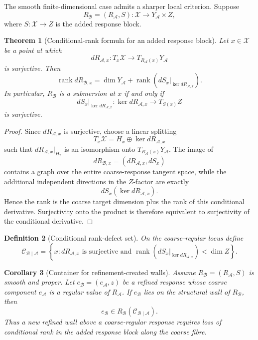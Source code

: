 \documentclass[11pt]{article}
\newtheorem{definition}{Definition}[section]
\newtheorem{theorem}[definition]{Theorem}
\newtheorem{corollary}[definition]{Corollary}
\newcommand{\X}{\mathcal X}
\newcommand{\Acal}{\mathcal A}
\newcommand{\Bcal}{\mathcal B}
\begin{document}
The smooth finite-dimensional case admits a sharper local criterion. Suppose
\[
R_{\Bcal}=(R_{\Acal},S):\X\to Y_{\Acal}\times Z,
\]
where \(S:\X\to Z\) is the added response block.

\begin{theorem}[Conditional-rank formula for an added response block]
\label{thm:conditional-rank}
Let \(x\in\X\) be a point at which
\[
dR_{\Acal,x}:T_x\X\to T_{R_{\Acal}(x)}Y_{\Acal}
\]
is surjective. Then
\[
\operatorname{rank}dR_{\Bcal,x}
=
\dim Y_{\Acal}
+
\operatorname{rank}
\left(
dS_x\big|_{\ker dR_{\Acal,x}}
\right).
\]
In particular, \(R_{\Bcal}\) is a submersion at \(x\) if and only if
\[
dS_x\big|_{\ker dR_{\Acal,x}}:
\ker dR_{\Acal,x}\to T_{S(x)}Z
\]
is surjective.
\end{theorem}

\begin{proof}
Since \(dR_{\Acal,x}\) is surjective, choose a linear splitting
\[
T_x\X=H_x\oplus\ker dR_{\Acal,x}
\]
such that \(dR_{\Acal,x}|_{H_x}\) is an isomorphism onto
\(T_{R_{\Acal}(x)}Y_{\Acal}\). The image of
\[
dR_{\Bcal,x}=(dR_{\Acal,x},dS_x)
\]
contains a graph over the entire coarse-response tangent space, while the
additional independent directions in the \(Z\)-factor are exactly
\[
dS_x(\ker dR_{\Acal,x}).
\]
Hence the rank is the coarse target dimension plus the rank of this
conditional derivative. Surjectivity onto the product is therefore
equivalent to surjectivity of the conditional derivative.
\end{proof}

\begin{definition}[Conditional rank-defect set]
On the coarse-regular locus define
\[
\mathcal C_{\Bcal\mid\Acal}
=
\left\{
x:
dR_{\Acal,x}\text{ is surjective and }
\operatorname{rank}
\left(dS_x|_{\ker dR_{\Acal,x}}\right)
<\dim Z
\right\}.
\]
\end{definition}

\begin{corollary}[Container for refinement-created walls]
\label{cor:new-wall-container}
Assume \(R_{\Bcal}=(R_{\Acal},S)\) is smooth and proper. Let
\(e_{\Bcal}=(e_{\Acal},z)\) be a refined response whose coarse component
\(e_{\Acal}\) is a regular value of \(R_{\Acal}\). If
\(e_{\Bcal}\) lies on the structural wall of \(R_{\Bcal}\), then
\[
e_{\Bcal}\in
R_{\Bcal}(\mathcal C_{\Bcal\mid\Acal}).
\]
Thus a new refined wall above a coarse-regular response requires loss of
conditional rank in the added response block along the coarse fibre.
\end{corollary}
\end{document}

